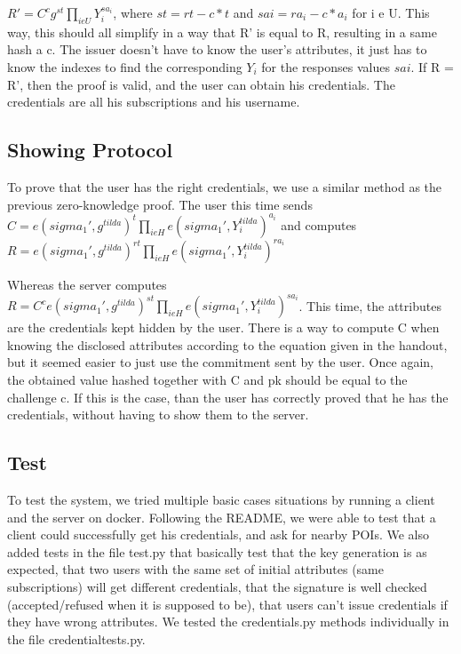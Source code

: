 \documentclass[10pt,conference,compsocconf]{IEEEtran}
\begin{document}
$ R' = C^c g^{st} \prod_{i e U}{Y_{i}^{sa_{i}}}$, where $st = rt - c*t$ and $sai = ra_{i} - c*a_{i}$ for i e U. This way, this should all simplify in a way that R' is equal to R, resulting in a same hash a c. The issuer doesn't have to know the user's attributes, it just has to know the indexes to find the corresponding $Y_{i}$ for the responses values $sai$.
If R = R', then the proof is valid, and the user can obtain his credentials. The credentials are all his subscriptions and his username.

\subsection{Showing Protocol}
To prove that the user has the right credentials, we use a similar method as the previous zero-knowledge proof. The user this time sends $C = e(sigma_{1}',g^{tilda})^t \prod_{i e H} e(sigma_{1}',Y_{i}^{tilda})^{a_{i}}$ and computes $ R = e(sigma_{1}',g^{tilda})^{rt} \prod_{i e H} e(sigma_{1}',Y_{i}^{tilda})^{ra_{i}}$ 
\\	
\hspace{1cm}

Whereas the server computes \\ $ R = C^c  e(sigma_{1}',g^{tilda})^{st} \prod_{i e H} e(sigma_{1}',Y_{i}^{tilda})^{sa_{i}}$. This time, the attributes are the credentials kept hidden by the user. There is a way to compute C when knowing the disclosed attributes according to the equation given in the handout, but it seemed easier to just use the commitment sent by the user. Once again, the obtained value hashed together with C and pk should be equal to the challenge c. If this is the case, than the user has correctly proved that he has the credentials, without having to show them to the server. 


\subsection{Test}
To test the system, we tried multiple basic cases situations by running a client and the server on docker. Following the README, we were able to test that a client could successfully get his credentials, and ask for nearby POIs. We also added tests in the file test.py that basically test that the key generation is as expected, that two users with the same set of initial attributes (same subscriptions) will get different credentials, that the signature is well checked (accepted/refused when it is supposed to be), that users can't issue credentials if they have wrong attributes. We tested the credentials.py methods individually in the file credentialtests.py.
\end{document}
